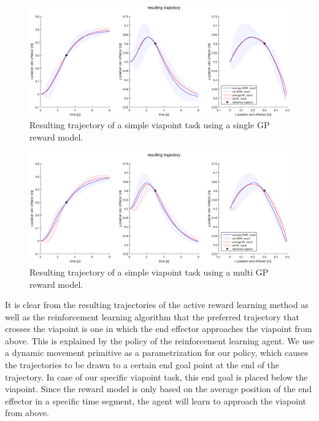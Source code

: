 \documentclass[mscThesis.tex]{subfiles}
\begin{document}
\begin{figure}[!htb]
    \centering
    \includegraphics[width=\textwidth, height = 6 cm]{figures/results/viapoint/trajectory_single_noise_sum.eps}
    \caption{Resulting trajectory of a simple viapoint task using a single GP reward model.}
    \label{fig:vp-single-noise-traject}
\end{figure}

    
\begin{figure}[!htb]
    \centering
    \includegraphics[width=\textwidth, height = 6 cm]{figures/results/viapoint/trajectory_multi_noise_sum.eps}
    \caption{Resulting trajectory of a simple viapoint task using a multi GP reward model.}
    \label{fig:vp-multi-noise-traject}
\end{figure}

It is clear from the resulting trajectories of the active reward learning method as well as the reinforcement learning algorithm that the preferred trajectory that crosses the viapoint is one in which the end effector approaches the viapoint from above. This is explained by the policy of the reinforcement learning agent. We use a dynamic movement primitive as a parametrization for our policy, which causes the trajectories to be drawn to a certain end goal point at the end of the trajectory. In case of our specific viapoint task, this end goal is placed below the viapoint. Since the reward model is only based on the average position of the end effector in a specific time segment, the agent will learn to approach the viapoint from above. 
\end{document}
